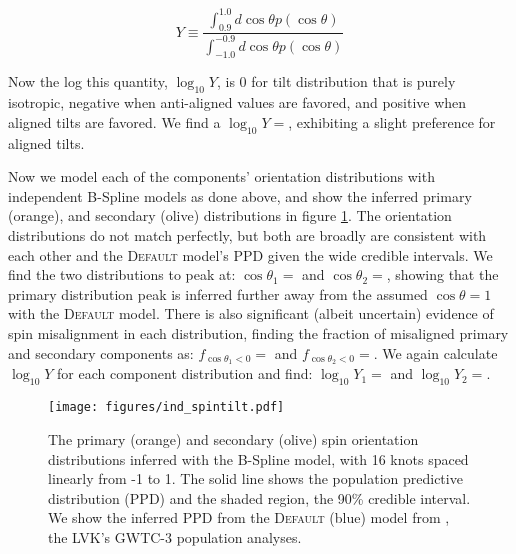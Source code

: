 \begin{equation}
    Y \equiv \frac{\int_{0.9}^{1.0} d\cos{\theta} p(\cos{\theta})}{\int_{-1.0}^{-0.9} d\cos{\theta} p(\cos{\theta})}
\end{equation}

\noindent Now the log this quantity, $\log_{10}Y$, is 0 for tilt distribution that is purely isotropic, negative when anti-aligned values are favored, 
and positive when aligned tilts are favored. We find a $\log_{10}Y=$, exhibiting a 
slight preference for aligned tilts.  

Now we model each of the components' orientation distributions with independent B-Spline models as done above, and show the inferred 
primary (orange), and secondary (olive) distributions in figure \ref{fig:ind_spintilt_dist}. The orientation distributions do not match perfectly, but both are broadly
are consistent with each other and the \textsc{Default} model's PPD given the wide credible intervals. We find the two distributions to peak at: $\cos{\theta_1}=$\result{$\CIPlusMinus{\macros[BSplineIndependentCompSpins][peakCosTilt1]}$} 
and $\cos{\theta_2}=$\result{$\CIPlusMinus{\macros[BSplineIndependentCompSpins][peakCosTilt2]}$}, showing that the primary distribution peak is inferred further away 
from the assumed $\cos{\theta}=1$ with the \textsc{Default} model. There is also significant (albeit uncertain) evidence of spin misalignment in each distribution, finding 
the fraction of misaligned primary and secondary components as: $f_{\cos{\theta_1}<0}=$\result{$\CIPlusMinus{\macros[BSplineIndependentCompSpins][negFrac1]}$} and 
$f_{\cos{\theta_2}<0}=$\result{$\CIPlusMinus{\macros[BSplineIndependentCompSpins][negFrac2]}$}. We again calculate $\log_{10}Y$  
for each component distribution and find: $\log_{10}Y_1=$ and 
$\log_{10}Y_2=$.

\begin{figure}
    \begin{centering}
        \texttt{[image: figures/ind\_spintilt.pdf]}
        \caption{The primary (orange) and secondary (olive) spin orientation distributions inferred with the B-Spline model, 
        with 16 knots spaced linearly from -1 to 1. The solid line shows the population predictive distribution (PPD) and the shaded region, the 90\% credible interval. 
        We show the inferred PPD from the \textsc{Default} (blue) model from \citet{o3b_astro_dist}, the LVK's GWTC-3 population analyses.}
        \label{fig:ind_spintilt_dist}
    \end{centering}
\end{figure}

